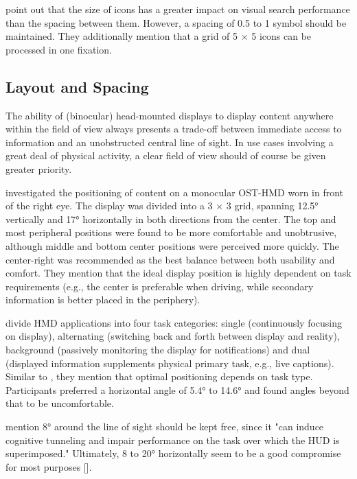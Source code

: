 \textcite{lindbergEffectIconSpacing2003} point out that the size of icons has a greater impact on visual search performance than the spacing between them. However, a spacing of 0.5 to 1 symbol should be maintained. They additionally mention that a grid of 5 $\times$ 5 icons can be processed in one fixation.

\subsection{Layout and Spacing}

The ability of (binocular) head-mounted displays to display content anywhere within the field of view always presents a trade-off between immediate access to information and an unobstructed central line of sight. In use cases involving a great deal of physical activity, a clear field of view should of course be given greater priority.

\textcite{chuaPositioningGlassInvestigating2016} investigated the positioning of content on a monocular OST-HMD worn in front of the right eye. The display was divided into a 3 $\times$ 3 grid, spanning 12.5° vertically and 17° horizontally in both directions from the center.
The top and most peripheral positions were found to be more comfortable and unobtrusive, although middle and bottom center positions were perceived more quickly. The center-right was recommended as the best balance between both usability and comfort.
They mention that the ideal display position is highly dependent on task requirements (e.g., the center is preferable when driving, while secondary information is better placed in the periphery).

\textcite{linFindingOptimumPosition2021} divide HMD applications into four task categories: single (continuously focusing on display), alternating (switching back and forth between display and reality), background (passively monitoring the display for notifications) and dual (displayed information supplements physical primary task, e.g., live captions). Similar to \textcite{chuaPositioningGlassInvestigating2016}, they mention that optimal positioning depends on task type.
Participants preferred a horizontal angle of 5.4° to 14.6° and found angles beyond that to be uncomfortable.

\textcite{dowellEffectVisualLocation2002} mention 8° around the line of sight should be kept free, since it "can induce cognitive tunneling and impair performance on the task over which the HUD is superimposed." 
Ultimately, 8 to 20° horizontally seem to be a good compromise for most purposes [\cite{linFindingOptimumPosition2021}].

